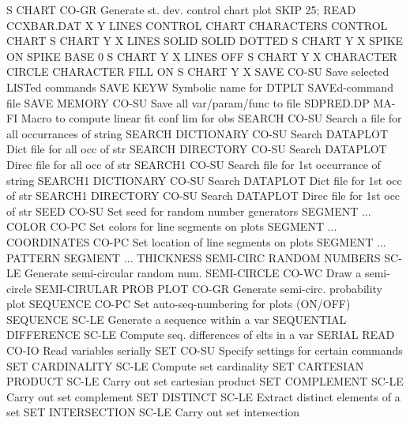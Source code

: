 S CHART                     CO-GR Generate st. dev. control chart plot
                                  SKIP 25; READ CCXBAR.DAT X Y
                                  LINES CONTROL CHART
                                  CHARACTERS CONTROL CHART
                                  S CHART Y X
                                  LINES SOLID SOLID DOTTED
                                  S CHART Y X
                                  SPIKE ON
                                  SPIKE BASE 0
                                  S CHART Y X
                                  LINES OFF
                                  S CHART Y X
                                  CHARACTER CIRCLE
                                  CHARACTER FILL ON
                                  S CHART Y X
SAVE                        CO-SU Save selected LISTed commands
SAVE                        KEYW  Symbolic name for DTPLT SAVEd-command file
SAVE MEMORY                 CO-SU Save all var/param/func to file
SDPRED.DP                   MA-FI Macro to compute linear fit conf lim for obs
SEARCH                      CO-SU Search a file for all occurrances of string
SEARCH DICTIONARY           CO-SU Search DATAPLOT Dict file for all occ of str
SEARCH DIRECTORY            CO-SU Search DATAPLOT Direc file for all occ of str
SEARCH1                     CO-SU Search file for 1st occurrance of string
SEARCH1 DICTIONARY          CO-SU Search DATAPLOT Dict file for 1st occ of str
SEARCH1 DIRECTORY           CO-SU Search DATAPLOT Direc file for 1st occ of str
SEED                        CO-SU Set seed for random number generators
SEGMENT ... COLOR           CO-PC Set colors for line segments on plots
SEGMENT ... COORDINATES     CO-PC Set location of line segments on plots
SEGMENT ... PATTERN
SEGMENT ... THICKNESS
SEMI-CIRC RANDOM NUMBERS    SC-LE Generate semi-circular random num.
SEMI-CIRCLE                 CO-WC Draw a semi-circle
SEMI-CIRULAR PROB PLOT      CO-GR Generate semi-circ. probability plot
SEQUENCE                    CO-PC Set auto-seq-numbering for plots (ON/OFF)
SEQUENCE                    SC-LE Generate a sequence within a var
SEQUENTIAL DIFFERENCE       SC-LE Compute seq. differences of elts in a var
SERIAL READ                 CO-IO Read variables serially
SET                         CO-SU Specify settings for certain commands
SET CARDINALITY             SC-LE Compute set cardinality
SET CARTESIAN PRODUCT       SC-LE Carry out set cartesian product
SET COMPLEMENT              SC-LE Carry out set complement
SET DISTINCT                SC-LE Extract distinct elements of a set
SET INTERSECTION            SC-LE Carry out set intersection
